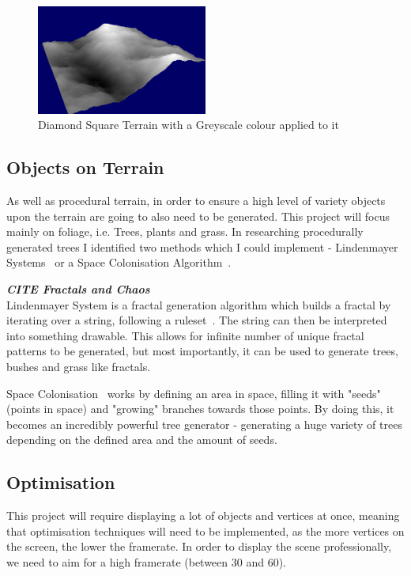\documentclass[a4paper,10pt]{report}
\begin{document}
\begin{figure}[h!]
    \centering
  \includegraphics[width=0.5\textwidth]{DiamondSquareGreyScale}
 \caption{Diamond Square Terrain with a Greyscale colour applied to it}
 \label{fig:DiamondSquareGrey}
\end{figure}

\subsection{Objects on Terrain}

As well as procedural terrain, in order to ensure a high level of variety objects upon the terrain are going to also need to be generated. This project will focus mainly on foliage, i.e. Trees, plants and grass. In researching procedurally generated trees I identified two methods which I could implement - Lindenmayer Systems~\cite{lindenmayer2017} or a Space Colonisation Algorithm~\cite{runions2007modeling}. 

\textbf{\textit{CITE Fractals and Chaos}}\\
Lindenmayer System is a fractal generation algorithm which builds a fractal by iterating over a string, following a ruleset~\cite{prusinkiewicz2012algorithmic}. The string can then be interpreted into something drawable. This allows for infinite number of unique fractal patterns to be generated, but most importantly, it can be used to generate trees, bushes and grass like fractals.  

Space Colonisation~\cite{runions2007modeling} works by defining an area in space, filling it with "seeds" (points in space) and "growing" branches towards those points. By doing this, it becomes an incredibly powerful tree generator - generating a huge variety of trees depending on the defined area and the amount of seeds.

\subsection{Optimisation}
This project will require displaying a lot of objects and vertices at once, meaning that optimisation techniques will need to be implemented, as the more vertices on the screen, the lower the framerate. In order to display the scene professionally, we need to aim for a high framerate (between 30 and 60).  \\
\end{document}
